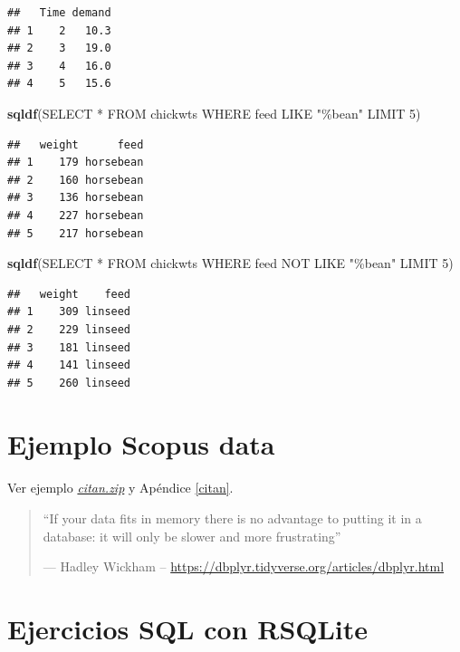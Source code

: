 \documentclass[
]{book}
\newenvironment{Shaded}{\begin{snugshade}}{\end{snugshade}}
\newcommand{\FunctionTok}[1]{\textcolor[rgb]{0.13,0.29,0.53}{\textbf{#1}}}
\newcommand{\NormalTok}[1]{#1}
\newcommand{\StringTok}[1]{\textcolor[rgb]{0.31,0.60,0.02}{#1}}
\begin{document}
\begin{verbatim}
##   Time demand
## 1    2   10.3
## 2    3   19.0
## 3    4   16.0
## 4    5   15.6
\end{verbatim}

\begin{Shaded}
\begin{Highlighting}[]
\FunctionTok{sqldf}\NormalTok{(}\StringTok{\textquotesingle{}SELECT * FROM chickwts WHERE feed LIKE "\%bean" LIMIT 5\textquotesingle{}}\NormalTok{)}
\end{Highlighting}
\end{Shaded}

\begin{verbatim}
##   weight      feed
## 1    179 horsebean
## 2    160 horsebean
## 3    136 horsebean
## 4    227 horsebean
## 5    217 horsebean
\end{verbatim}

\begin{Shaded}
\begin{Highlighting}[]
\FunctionTok{sqldf}\NormalTok{(}\StringTok{\textquotesingle{}SELECT * FROM chickwts WHERE feed NOT LIKE "\%bean" LIMIT 5\textquotesingle{}}\NormalTok{)}
\end{Highlighting}
\end{Shaded}

\begin{verbatim}
##   weight    feed
## 1    309 linseed
## 2    229 linseed
## 3    181 linseed
## 4    141 linseed
## 5    260 linseed
\end{verbatim}

\section{Ejemplo Scopus data}\label{ejemplo-scopus-data}

Ver ejemplo \href{data/citan.zip}{\emph{citan.zip}} y Apéndice \ref{citan}.

\begin{quote}
``If your data fits in memory
there is no advantage to putting it in a database:
it will only be slower and more frustrating''

--- Hadley Wickham -- \url{https://dbplyr.tidyverse.org/articles/dbplyr.html}
\end{quote}

\section{Ejercicios SQL con RSQLite}\label{ejercicios-sql-con-rsqlite}
\end{document}
